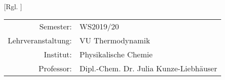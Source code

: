 [Rgl. ]{}{}
  
\maketitle %
  
\begin{center}
  \begin{tabular}{r p{4cm}}
    Semester: & WS2019/20 \\
    Lehrveranstaltung: & VU Thermodynamik \\
    Institut: & Physikalische Chemie \\
    Professor: & Dipl.-Chem. Dr. Julia Kunze-Liebhäuser %
  \end{tabular}
\end{center}


\tableofcontents